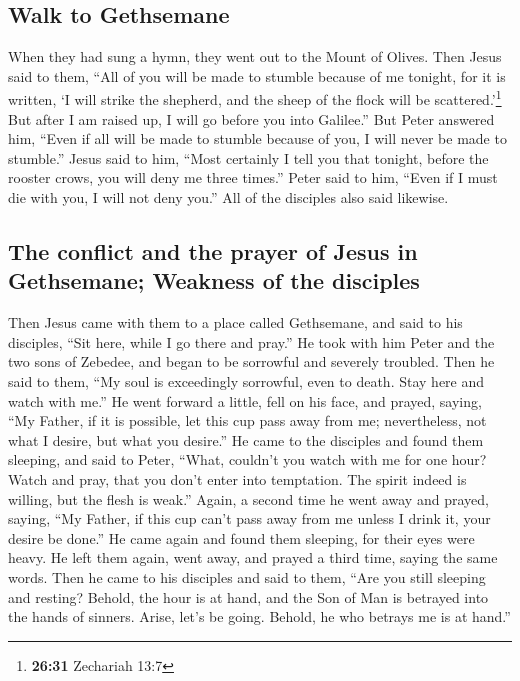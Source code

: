 \hypertarget{walk-to-gethsemane}{%
\subsection{Walk to Gethsemane}\label{walk-to-gethsemane}}

 When they had sung a hymn, they went out to the Mount of
Olives.  Then Jesus said to them, ``All of you will be
made to stumble because of me tonight, for it is written, `I will strike
the shepherd, and the sheep of the flock will be scattered.'\footnote{\textbf{26:31}
  Zechariah 13:7}  But after I am raised up, I will go
before you into Galilee.''  But Peter answered him,
``Even if all will be made to stumble because of you, I will never be
made to stumble.''  Jesus said to him, ``Most certainly I
tell you that tonight, before the rooster crows, you will deny me three
times.''  Peter said to him, ``Even if I must die with
you, I will not deny you.'' All of the disciples also said likewise.

\hypertarget{the-conflict-and-the-prayer-of-jesus-in-gethsemane-weakness-of-the-disciples}{%
\subsection{The conflict and the prayer of Jesus in Gethsemane; Weakness
of the
disciples}\label{the-conflict-and-the-prayer-of-jesus-in-gethsemane-weakness-of-the-disciples}}

 Then Jesus came with them to a place called Gethsemane,
and said to his disciples, ``Sit here, while I go there and pray.''
 He took with him Peter and the two sons of Zebedee, and
began to be sorrowful and severely troubled.  Then he
said to them, ``My soul is exceedingly sorrowful, even to death. Stay
here and watch with me.''  He went forward a little, fell
on his face, and prayed, saying, ``My Father, if it is possible, let
this cup pass away from me; nevertheless, not what I desire, but what
you desire.''  He came to the disciples and found them
sleeping, and said to Peter, ``What, couldn't you watch with me for one
hour?  Watch and pray, that you don't enter into
temptation. The spirit indeed is willing, but the flesh is weak.''
 Again, a second time he went away and prayed, saying,
``My Father, if this cup can't pass away from me unless I drink it, your
desire be done.''  He came again and found them sleeping,
for their eyes were heavy.  He left them again, went
away, and prayed a third time, saying the same words. 
Then he came to his disciples and said to them, ``Are you still sleeping
and resting? Behold, the hour is at hand, and the Son of Man is betrayed
into the hands of sinners.  Arise, let's be going.
Behold, he who betrays me is at hand.''

